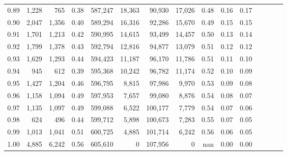 \begin{tabular}{rrrcrrrrrrrrrrr}
0.89 &   1,228 &    765 &                                       0.38 &  587,247 &   18,363 &   90,930 &   17,026 &  0.48 &  0.16 &                         0.17 \\
0.90 &   2,047 &  1,356 &                                       0.40 &  589,294 &   16,316 &   92,286 &   15,670 &  0.49 &  0.15 &                         0.15 \\
0.91 &   1,701 &  1,213 &                                       0.42 &  590,995 &   14,615 &   93,499 &   14,457 &  0.50 &  0.13 &                         0.14 \\
0.92 &   1,799 &  1,378 &                                       0.43 &  592,794 &   12,816 &   94,877 &   13,079 &  0.51 &  0.12 &                         0.12 \\
0.93 &   1,629 &  1,293 &                                       0.44 &  594,423 &   11,187 &   96,170 &   11,786 &  0.51 &  0.11 &                         0.10 \\
0.94 &     945 &    612 &                                       0.39 &  595,368 &   10,242 &   96,782 &   11,174 &  0.52 &  0.10 &                         0.09 \\
0.95 &   1,427 &  1,204 &                                       0.46 &  596,795 &    8,815 &   97,986 &    9,970 &  0.53 &  0.09 &                         0.08 \\
0.96 &   1,158 &  1,094 &                                       0.49 &  597,953 &    7,657 &   99,080 &    8,876 &  0.54 &  0.08 &                         0.07 \\
0.97 &   1,135 &  1,097 &                                       0.49 &  599,088 &    6,522 &  100,177 &    7,779 &  0.54 &  0.07 &                         0.06 \\
0.98 &     624 &    496 &                                       0.44 &  599,712 &    5,898 &  100,673 &    7,283 &  0.55 &  0.07 &                         0.05 \\
0.99 &   1,013 &  1,041 &                                       0.51 &  600,725 &    4,885 &  101,714 &    6,242 &  0.56 &  0.06 &                         0.05 \\
1.00 &   4,885 &  6,242 &                                       0.56 &  605,610 &        0 &  107,956 &        0 &   nan &  0.00 &                         0.00 \\
\bottomrule
\end{tabular}
